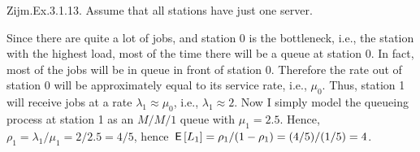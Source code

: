 \begin{exercise}
Zijm.Ex.3.1.13. Assume that all stations have just one server.
\begin{solution}
 Since there are quite a lot of jobs, and station 0 is the bottleneck, i.e., the station with the highest load, most of the time there will be a queue at station 0.
 In fact, most of the jobs will be in queue in front of station 0.
 Therefore the rate out of station 0 will be approximately equal to its service rate, i.e., $\mu_0$.
 Thus, station 1 will receive jobs at a rate $\lambda_1\approx\mu_0$, i.e., $\lambda_1 \approx 2$.
 Now I simply model the queueing process at station 1 as an $M/M/1$ queue with $\mu_1=2.5$.
 Hence, $\rho_1 = \lambda_1/\mu_1=2/2.5 = 4/5$, hence $\,\mathsf{E}\left[L_1\right] = \rho_1/(1-\rho_1) = (4/5)/(1/5) = 4$.
\end{solution}
\end{exercise}



